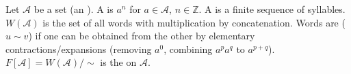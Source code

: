 Let $\mathcal{A}$ be a set (an ). A  is $a^n$ for $a \in \mathcal{A}$, $n \in \mathbb{Z}$. A  is a finite sequence of syllables. $W(\mathcal{A})$ is the set of all words with multiplication by concatenation. Words are  ($u \sim v$) if one can be obtained from the other by elementary contractions/expansions (removing $a^0$, combining $a^p a^q$ to $a^{p+q}$). $F[\mathcal{A}] = W(\mathcal{A})/{\sim}$ is the  on $\mathcal{A}$.
